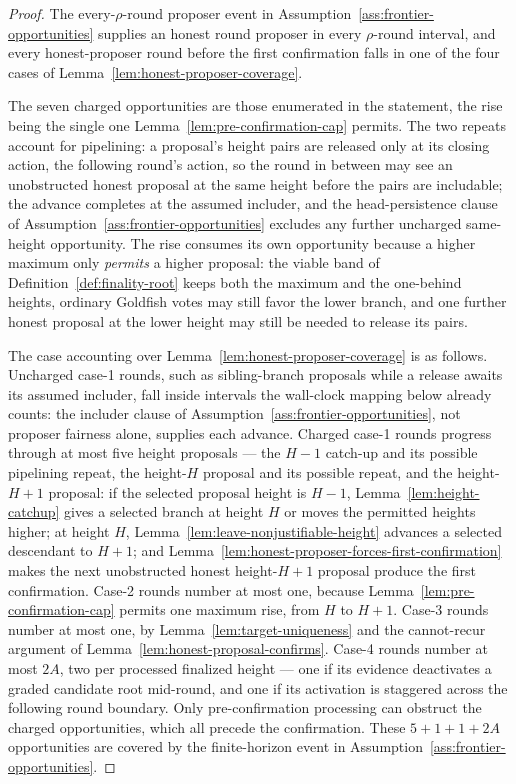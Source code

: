 \begin{proof}
The every-\(\rho\)-round proposer event in
Assumption~\ref{ass:frontier-opportunities} supplies an honest round
proposer in every \(\rho\)-round interval, and every honest-proposer
round before the first confirmation falls in one of the four cases of
Lemma~\ref{lem:honest-proposer-coverage}.

The seven charged opportunities are those enumerated in the
statement, the rise being the single one
Lemma~\ref{lem:pre-confirmation-cap} permits.
The two repeats account for pipelining: a proposal's height pairs are
released only at its closing action, the following round's action, so
the round in between may see an unobstructed honest proposal at the same
height before the pairs are includable; the advance completes at the
assumed includer, and the head-persistence clause of
Assumption~\ref{ass:frontier-opportunities} excludes any further
uncharged same-height opportunity.  The rise consumes its own
opportunity because a higher maximum only \emph{permits} a higher
proposal: the viable band of Definition~\ref{def:finality-root} keeps
both the maximum and the one-behind heights, ordinary Goldfish votes may
still favor the lower branch, and one further honest proposal at the
lower height may still be needed to release its pairs.

The case accounting over Lemma~\ref{lem:honest-proposer-coverage} is as
follows.  Uncharged case-1 rounds, such as sibling-branch proposals
while a release awaits its assumed includer, fall inside intervals the
wall-clock mapping below already counts: the includer clause of
Assumption~\ref{ass:frontier-opportunities}, not proposer fairness
alone, supplies each advance.  Charged case-1 rounds progress through at
most five height proposals --- the \(H-1\) catch-up and its possible
pipelining repeat, the height-\(H\) proposal and its possible repeat,
and the height-\(H+1\) proposal: if the selected proposal height is
\(H-1\), Lemma~\ref{lem:height-catchup} gives a selected branch at
height \(H\) or moves the permitted heights higher; at height \(H\),
Lemma~\ref{lem:leave-nonjustifiable-height} advances a selected
descendant to \(H+1\); and
Lemma~\ref{lem:honest-proposer-forces-first-confirmation} makes the
next unobstructed honest height-\(H+1\) proposal produce the first
confirmation.  Case-2 rounds number at most one, because
Lemma~\ref{lem:pre-confirmation-cap} permits one maximum rise, from
\(H\) to \(H+1\).  Case-3 rounds number at most one, by
Lemma~\ref{lem:target-uniqueness} and the cannot-recur argument of
Lemma~\ref{lem:honest-proposal-confirms}.  Case-4 rounds number at most
\(2A\), two per processed finalized height --- one if its evidence
deactivates a graded candidate root mid-round, and one if its activation
is staggered across the following round boundary.  Only
pre-confirmation processing can obstruct the charged opportunities,
which all precede the confirmation.  These \(5+1+1+2A\) opportunities
are covered by the finite-horizon event in
Assumption~\ref{ass:frontier-opportunities}.


\end{proof}

